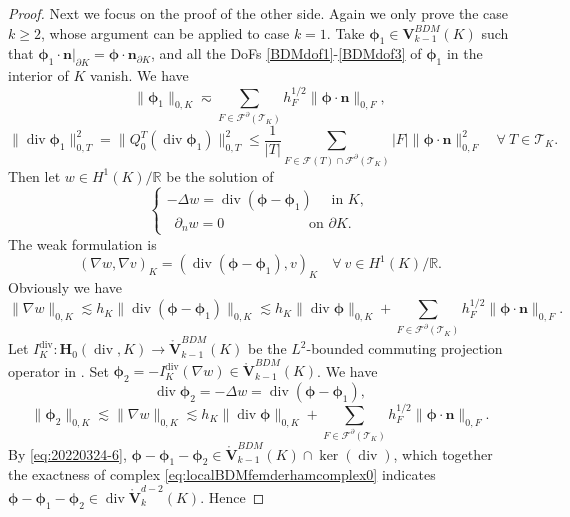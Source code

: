 \documentclass[10pt]{amsart}
\renewcommand{\div}{\operatorname{div}}
\numberwithin{equation}{section}
\begin{document}
\begin{proof}
Next we focus on the proof of the other side. Again we only prove the case $k\geq2$, whose argument can be applied to case $k=1$. Take $\boldsymbol{\phi}_1\in\boldsymbol{V}_{k-1}^{BDM}(K)$ such that $\boldsymbol{\phi}_1\cdot\boldsymbol{n}|_{\partial K}=\boldsymbol{\phi}\cdot\boldsymbol{n}_{\partial K}$, and all the DoFs \eqref{BDMdof1}-\eqref{BDMdof3} of $\boldsymbol{\phi}_1$ in the interior of $K$ vanish. We have
\begin{equation}\label{eq:20220324-5}
\|\boldsymbol{\phi}_1\|_{0,K}\eqsim \sum_{F\in\mathcal F^{\partial}(\mathcal T_K)}h_F^{1/2}\|\boldsymbol{\phi}\cdot\boldsymbol{n}\|_{0,F},
\end{equation}
\[
\|\div\boldsymbol{\phi}_1\|_{0,T}^2=\|Q_0^T(\div\boldsymbol{\phi}_1)\|_{0,T}^2
\leq\frac{1}{|T|}\sum_{F\in\mathcal F(T)\cap\mathcal F^{\partial}(\mathcal T_K)}|F|\|\boldsymbol{\phi}\cdot\boldsymbol{n}\|_{0,F}^2\quad\forall~T\in\mathcal T_K.
\]
Then let $w\in H^1(K)/\mathbb R$ be the solution of 
\[
\begin{cases}
-\Delta w= \div(\boldsymbol{\phi}-\boldsymbol{\phi}_1)\quad\textrm{ in } K, \\
\;\;\partial_nw=0\qquad\qquad\quad\;\;\,\textrm{ on } \partial K.
\end{cases}
\]
The weak formulation is
\[
(\nabla w, \nabla v)_K=(\div(\boldsymbol{\phi}-\boldsymbol{\phi}_1), v)_K\quad\forall~v\in H^1(K)/\mathbb R.
\]
Obviously we have
\[
\|\nabla w\|_{0,K}\lesssim h_K\|\div(\boldsymbol{\phi}-\boldsymbol{\phi}_1)\|_{0,K}\lesssim h_K\|\div\boldsymbol{\phi}\|_{0,K} +\sum_{F\in\mathcal F^{\partial}(\mathcal T_K)}h_F^{1/2}\|\boldsymbol{\phi}\cdot\boldsymbol{n}\|_{0,F}.
\]
Let $I_K^{\div}: \boldsymbol{H}_0(\div,K)\to\mathring{\boldsymbol{V}}_{k-1}^{BDM}(K)$ be the $L^2$-bounded commuting projection operator in \cite{ChristiansenWinther2008}. Set $\boldsymbol{\phi}_2=-I_K^{\div}(\nabla w)\in\mathring{\boldsymbol{V}}_{k-1}^{BDM}(K)$. We have
\begin{equation}\label{eq:20220324-6}
\div\boldsymbol{\phi}_2=-\Delta w=\div(\boldsymbol{\phi}-\boldsymbol{\phi}_1),
\end{equation}
\begin{equation}\label{eq:20220324-7}
\|\boldsymbol{\phi}_2\|_{0,K}\lesssim \|\nabla w\|_{0,K}\lesssim h_K\|\div\boldsymbol{\phi}\|_{0,K} +\sum_{F\in\mathcal F^{\partial}(\mathcal T_K)}h_F^{1/2}\|\boldsymbol{\phi}\cdot\boldsymbol{n}\|_{0,F}.
\end{equation}
By \eqref{eq:20220324-6}, $\boldsymbol{\phi}-\boldsymbol{\phi}_1-\boldsymbol{\phi}_2\in\mathring{\boldsymbol{V}}_{k-1}^{BDM}(K)\cap\ker(\div)$, which together the exactness of complex \eqref{eq:localBDMfemderhamcomplex0} indicates $\boldsymbol{\phi}-\boldsymbol{\phi}_1-\boldsymbol{\phi}_2\in\div\mathring{\boldsymbol{V}}_{k}^{d-2}(K)$. Hence

\end{proof}
\end{document}
